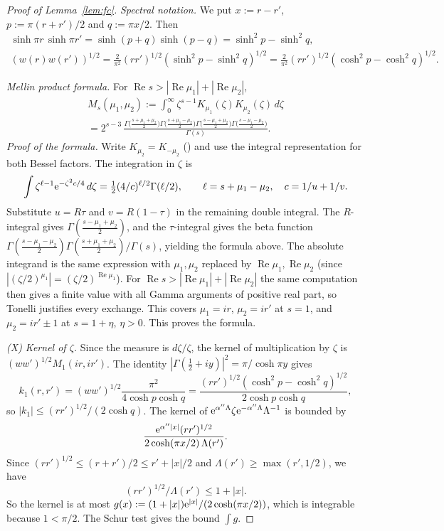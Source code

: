 \begin{proof}[Proof of Lemma~\ref{lem:fc}]
\medskip\noindent\emph{Spectral notation.} We put $x:=r-r'$, $p:=\pi(r+r')/2$ and $q:=\pi x/2$. Then
\begin{gather*}
\sinh\pi r\,\sinh\pi r'=\sinh(p+q)\sinh(p-q)=\sinh^2p-\sinh^2q,\\
(w(r)w(r'))^{1/2}=\tfrac{2}{\pi^2}(rr')^{1/2}(\sinh^2p-\sinh^2q)^{1/2}=\tfrac{2}{\pi^2}(rr')^{1/2}(\cosh^2p-\cosh^2q)^{1/2}.
\end{gather*}

\medskip\noindent\emph{Mellin product formula.} For $\operatorname{Re}s>|\operatorname{Re}\mu_1|+|\operatorname{Re}\mu_2|$,
\begin{multline*}
M_s(\mu_1,\mu_2):=\int_0^\infty \zeta^{s-1}K_{\mu_1}(\zeta)K_{\mu_2}(\zeta)\,d\zeta\\=2^{s-3}\,\frac{\Gamma\bigl(\tfrac{s+\mu_1+\mu_2}{2}\bigr)\Gamma\bigl(\tfrac{s+\mu_1-\mu_2}{2}\bigr)\Gamma\bigl(\tfrac{s-\mu_1+\mu_2}{2}\bigr)\Gamma\bigl(\tfrac{s-\mu_1-\mu_2}{2}\bigr)}{\Gamma(s)}.
\end{multline*}
\emph{Proof of the formula.} Write $K_{\mu_2}=K_{-\mu_2}$ (\cite[10.27.3]{DLMF}) and use the integral representation
\cite[10.32.10]{DLMF} for both Bessel factors. The integration in $\zeta$ is
\[
\int \zeta^{\ell-1}\mathrm{e}^{-\zeta^2c/4}\,d\zeta=\tfrac12(4/c)^{\ell/2}\Gamma(\ell/2),
\qquad \ell=s+\mu_1-\mu_2,\quad c=1/u+1/v.
\]
Substitute $u=R\tau$ and $v=R(1-\tau)$ in the remaining double integral. The $R$-integral gives
$\Gamma(\tfrac{s-\mu_1+\mu_2}{2})$, and the $\tau$-integral gives the beta function
$\Gamma(\tfrac{s-\mu_1-\mu_2}{2})\Gamma(\tfrac{s+\mu_1+\mu_2}{2})/\Gamma(s)$, yielding the formula above.
The absolute integrand is the same expression with $\mu_1,\mu_2$ replaced by $\operatorname{Re}\mu_1,\operatorname{Re}\mu_2$ (since $|(\zeta/2)^{\mu_1}|=(\zeta/2)^{\operatorname{Re}\mu_1}$). For $\operatorname{Re}s>|\operatorname{Re}\mu_1|+|\operatorname{Re}\mu_2|$ the same computation then gives a finite value with all Gamma arguments of positive real part, so Tonelli justifies every exchange. This covers $\mu_1=i r$, $\mu_2=i r'$ at $s=1$, and $\mu_2=i r'\pm1$ at $s=1+\eta$, $\eta>0$. This proves the formula.

\medskip\noindent\emph{(X) Kernel of $\zeta$.}
Since the measure is $d\zeta/\zeta$, the kernel of multiplication by $\zeta$ is $(w w')^{1/2}M_1(ir,ir')$. The identity $|\Gamma(\tfrac12+iy)|^2=\pi/\cosh\pi y$ gives
\[
k_1(r,r')=(ww')^{1/2}\frac{\pi^2}{4\cosh p\cosh q}=\frac{(rr')^{1/2}(\cosh^2p-\cosh^2q)^{1/2}}{2\cosh p\cosh q},
\]
so $|k_1|\le(rr')^{1/2}/(2\cosh q)$.
The kernel of $\mathrm{e}^{\alpha''\Lambda}\zeta\mathrm{e}^{-\alpha''\Lambda}\Lambda^{-1}$ is bounded by
\[
\frac{\mathrm{e}^{\alpha''|x|}(rr')^{1/2}}{2\cosh(\pi x/2)\,\Lambda(r')}.
\]
Since $(rr')^{1/2}\le(r+r')/2\le r'+|x|/2$ and $\Lambda(r')\ge\max(r',1/2)$, we have
\[
(rr')^{1/2}/\Lambda(r')\le1+|x|.
\]
So the kernel is at most $g(x):=(1+|x|)\mathrm{e}^{|x|}/(2\cosh(\pi x/2))$, which is integrable because $1<\pi/2$. The Schur test gives the bound $\int g$.


\end{proof}
